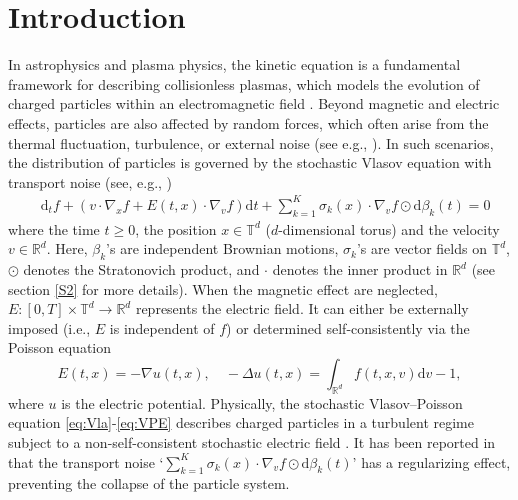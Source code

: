 \documentclass[11pt,reqno]{amsproc}
\newcommand{\ud}{\mathrm d}
\newcommand{\R}{\mathbb{R}}
\numberwithin{equation}{section}
\begin{document}
\maketitle
\section{Introduction}
In astrophysics and plasma physics, the kinetic equation is a fundamental framework for describing collisionless plasmas, which models the evolution of charged particles within an electromagnetic field \cite{EO14vp,FP84}. 
Beyond magnetic and electric effects, particles are also affected by random forces, which often arise from the thermal fluctuation, turbulence, or external noise 
 (see e.g., \cite{BB21,GIVW10}). In such scenarios, the distribution of particles is governed by the stochastic Vlasov equation with transport noise (see, e.g., \cite{BC24, FFPV17})
\begin{align}\label{eq:Vla}
	&\ud_tf +\left(v\cdot \nabla_xf+E(t,x)\cdot\nabla_vf\right)\ud t
	+\sum_{k=1}^K\sigma_k(x)\cdot\nabla_v f\odot\ud \beta_k(t)=0
\end{align}
where the time $t\ge 0$, the position $x\in\mathbb{T}^d$ ($d$-dimensional torus) and the velocity $v\in\R^d$. Here, $\beta_k$'s are independent Brownian motions, $\sigma_k$'s are vector fields on $\mathbb{T}^d$, $\odot$ denotes the Stratonovich product, and $\cdot$ denotes the inner product in $\R^d$ (see section \ref{S2} for more details).
When the magnetic effect are neglected, $E:[0,T]\times\mathbb{T}^d\to \R^d$ represents the electric field. It can either be 
externally imposed (i.e., $E$ is independent of $f$) or determined self-consistently via the Poisson equation \cite{GR96}
 \begin{equation}\label{eq:VPE}
E(t,x)=-\nabla u(t,x),\quad -
\Delta u(t,x)=\int_{\R^d}f(t,x,v)\ud v-1, 
\end{equation}
where $u$ is the electric potential. Physically, the stochastic Vlasov--Poisson equation \eqref{eq:Vla}-\eqref{eq:VPE} describes charged particles in a turbulent regime subject to a non-self-consistent stochastic electric field \cite{BB21}. It has been reported in \cite{DFV14} that the transport noise ‘$\sum_{k=1}^K\sigma_k(x)\cdot\nabla_v f\odot \ud \beta_k(t)$’ has a regularizing effect, preventing the collapse of the particle system. 
\end{document}
